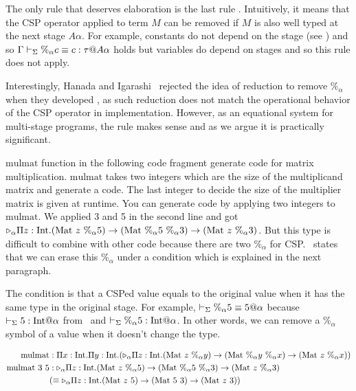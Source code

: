 The only rule that deserves elaboration is the last rule \QPercent.
Intuitively, it means that the CSP operator applied to term $M$ can be
removed if $M$ is also well typed at the next stage \(A\alpha\).
For example, constants do not depend on the stage (see \TConst) and
so \(\Gamma\vdash_\Sigma \%_\alpha c \equiv c : \tau @ A\alpha\) holds but variables
do depend on stages and so this rule does not apply.

Interestingly, Hanada and Igarashi~\cite{} rejected the idea of
reduction to remove $\%_\alpha$ when they developed \LTP{}, as such
reduction does not match the operational behavior of the CSP operator
in implementation.  However, as an equational system for multi-stage
programs, the rule \QPercent makes sense and as we argue 
it is practically significant.


$\text{mulmat}$ function in the following code fragment generate code for matrix multiplication.
$\text{mulmat}$ takes two integers which are the size of the multiplicand matrix and generate a code.
The last integer to decide the size of the multiplier matrix is given at runtime.
You can generate code by applying two integers to $\text{mulmat}$.
We applied 3 and 5 in the second line and got ${\mathop{\triangleright}}_\alpha \Pi z:\textrm{Int}.(\textrm{Mat}\ z\ \%_\alpha 5) \to (\textrm{Mat}\ \%_\alpha 5\ \%_\alpha 3) \to (\textrm{Mat}\ z\ \%_\alpha 3)$.
But this type is difficult to combine with other code because there are two $\%_\alpha$ for CSP.
\QPercent\ states that we can erase this $\%_\alpha$ under a condition which is explained in the next paragraph.

The condition is that a CSPed value equals to the original value when it has the same type in the original stage.
For example, $\vdash_\Sigma \%_\alpha 5 \equiv 5 @ \alpha$ because $ \vdash_\Sigma 5 : \textrm{Int} @ \alpha $ from \TConst\ and  $ \vdash_\Sigma \%_\alpha 5 : \textrm{Int} @ \alpha$.
In other words, we can remove a $\%_\alpha$ symbol of a value when it doesn't change the type.

	{
		\begin{align*}
			\text{mulmat}       & : \Pi x:\textrm{Int}.\Pi y:\textrm{Int}.({\mathop{\triangleright}}_\alpha \Pi z:\textrm{Int}.(\textrm{Mat}\ z\ \%_\alpha y) \to (\textrm{Mat}\ \%_\alpha y\ \%_\alpha x) \to (\textrm{Mat}\ z\ \%_\alpha x)) \\
			\text{mulmat}\ 3\ 5 & : {\mathop{\triangleright}}_\alpha \Pi z:\textrm{Int}.(\textrm{Mat}\ z\ \%_\alpha 5) \to (\textrm{Mat}\ \%_\alpha 5\ \%_\alpha 3) \to (\textrm{Mat}\ z\ \%_\alpha 3)                     \\
			                    & (\equiv {\mathop{\triangleright}}_\alpha \Pi z:\textrm{Int}.(\textrm{Mat}\ z\ 5) \to (\textrm{Mat}\ 5\ 3) \to (\textrm{Mat}\ z\ 3) )                                                         \\
		\end{align*}
	}

